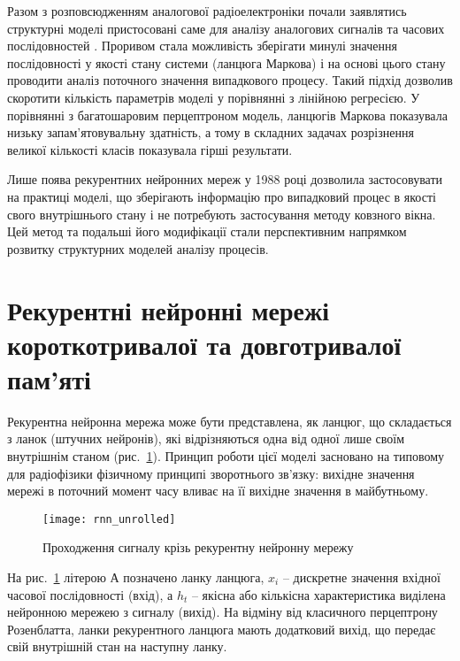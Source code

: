 Разом з розповсюдженням аналогової радіоелектроніки почали заявлятись 
структурні моделі пристосовані саме для аналізу аналогових сигналів 
та часових послідовностей \cite{imp:Markov1906}. Проривом стала можливість
зберігати минулі значення послідовності у якості стану системи 
(ланцюга Маркова) і на основі цього стану проводити аналіз поточного 
значення випадкового процесу. Такий підхід дозволив скоротити кількість 
параметрів моделі у порівнянні з лінійною регресією. У порівнянні з 
багатошаровим перцептроном модель, ланцюгів Маркова показувала низьку 
запам'ятовувальну здатність, а тому в складних задачах розрізнення великої 
кількості класів показувала гірші результати.

Лише поява рекурентних нейронних мереж у 1988 році \cite{imp:Rumelhart1988} 
дозволила застосовувати на практиці моделі, що зберігають інформацію про 
випадковий процес в якості свого внутрішнього стану і не потребують 
застосування методу ковзного вікна. Цей метод та подальші його модифікації
стали перспективним напрямком розвитку структурних моделей аналізу процесів. 


\section{Рекурентні нейронні мережі короткотривалої та довготривалої пам'яті}

Рекурентна нейронна мережа може бути представлена, як ланцюг, що складається
з ланок (штучних нейронів), які відрізняються одна від одної лише своїм 
внутрішнім станом (рис.~\ref{fig:rnn_unrolled}). Принцип роботи цієї моделі 
засновано на типовому для радіофізики фізичному принципі зворотнього зв'язку:
вихідне значення мережі в поточний момент часу вливає на її вихідне значення 
в майбутньому.

\begin{figure}[htbp] \begin{center}
\texttt{[image: rnn\_unrolled]}
\caption{Проходження сигналу крізь рекурентну нейронну мережу}
\label{fig:rnn_unrolled}
\end{center} \end{figure}

На рис.~\ref{fig:rnn_unrolled} літерою А позначено ланку ланцюга, $ x_i $ --
дискретне значення вхідної часової послідовності (вхід), а $ h_t $ -- якісна 
або кількісна характеристика виділена нейронною мережею з сигналу (вихід). 
На відміну від класичного перцептрону Розенблатта, ланки рекурентного ланцюга 
мають додатковий вихід, що передає свій внутрішній стан на наступну ланку.

